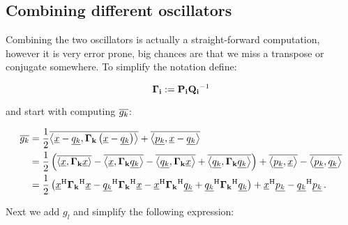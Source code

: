 \documentclass[a4paper,10pt]{article}
\begin{document}
\subsection{Combining different oscillators}

Combining the two oscillators is actually a straight-forward computation,
however it is very error prone, big chances are that we miss a transpose
or conjugate somewhere. To simplify the notation define:

\begin{equation}
  \mathbf{\Gamma_i} := \mathbf{P_i}\mathbf{Q_i}{}^{-1}
\end{equation}

and start with computing $\overline{g_k}$:

\begin{equation}
\begin{split}
 \overline{g_k}
 & =
 \frac{1}{2}\overline{\left\langle \underline{x}-\underline{q_k} , \mathbf{\Gamma_k} \left(\underline{x}-\underline{q_k}\right) \right\rangle}
 +\overline{\left\langle \underline{p_k} , \underline{x}-\underline{q_k} \right\rangle} \\
 & =
 \frac{1}{2} \left(
                \overline{\left\langle \underline{x} , \mathbf{\Gamma_k} \underline{x} \right\rangle}
               -\overline{\left\langle \underline{x} , \mathbf{\Gamma_k} \underline{q_k} \right\rangle}
               -\overline{\left\langle \underline{q_k} , \mathbf{\Gamma_k} \underline{x} \right\rangle}
               +\overline{\left\langle \underline{q_k} , \mathbf{\Gamma_k} \underline{q_k} \right\rangle}
              \right)
 + \overline{\left\langle \underline{p_k} , \underline{x} \right\rangle}
 - \overline{\left\langle \underline{p_k} , \underline{q_k} \right\rangle} \\
 & =
 \frac{1}{2} \left(
               \underline{x}{}^{\textnormal{H}} \mathbf{\Gamma_k}{}^{\textnormal{H}} \underline{x}
              -\underline{q_k}{}^{\textnormal{H}} \mathbf{\Gamma_k}{}^{\textnormal{H}} \underline{x}
              -\underline{x}{}^{\textnormal{H}} \mathbf{\Gamma_k}{}^{\textnormal{H}} \underline{q_k}
              +\underline{q_k}{}^{\textnormal{H}} \mathbf{\Gamma_k}{}^{\textnormal{H}} \underline{q_k}
              \right)
 + \underline{x}{}^{\textnormal{H}} \underline{p_k} - \underline{q_k}{}^{\textnormal{H}} \underline{p_k} \,.
\end{split}
\end{equation}

Next we add $g_l$ and simplify the following expression:
\end{document}
